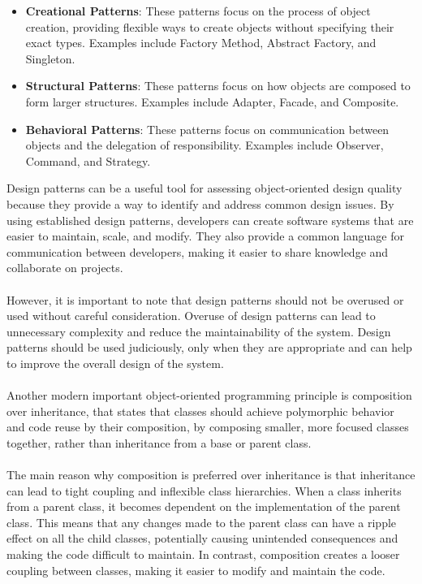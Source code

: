 \begin{itemize}
    \item \textbf{Creational Patterns}: These patterns focus on the process of object creation, providing flexible ways to create objects without specifying their exact types. Examples include Factory Method, Abstract Factory, and Singleton.
    \item \textbf{Structural Patterns}: These patterns focus on how objects are composed to form larger structures. Examples include Adapter, Facade, and Composite.
    \item \textbf{Behavioral Patterns}: These patterns focus on communication between objects and the delegation of responsibility. Examples include Observer, Command, and Strategy.
\end{itemize}
Design patterns can be a useful tool for assessing object-oriented design quality because they provide a way to identify and address common design issues. By using established design patterns, developers can create software systems that are easier to maintain, scale, and modify. They also provide a common language for communication between developers, making it easier to share knowledge and collaborate on projects.

\paragraph{}
However, it is important to note that design patterns should not be overused or used without careful consideration. Overuse of design patterns can lead to unnecessary complexity and reduce the maintainability of the system. Design patterns should be used judiciously, only when they are appropriate and can help to improve the overall design of the system.

\paragraph{}
Another modern important object-oriented programming principle is composition over inheritance, that states that classes should achieve polymorphic behavior and code reuse by their composition, by composing smaller, more focused classes together, rather than inheritance from a base or parent class.

\paragraph{}
The main reason why composition is preferred over inheritance is that inheritance can lead to tight coupling and inflexible class hierarchies. When a class inherits from a parent class, it becomes dependent on the implementation of the parent class. This means that any changes made to the parent class can have a ripple effect on all the child classes, potentially causing unintended consequences and making the code difficult to maintain. In contrast, composition creates a looser coupling between classes, making it easier to modify and maintain the code.

